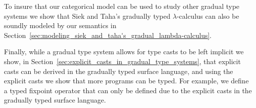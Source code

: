 To insure that our categorical model can be used to study other
gradual type systems we show that Siek and Taha's gradually typed
$\lambda$-calculus \cite{Siek:2006,Siek:2015} can also be soundly
modeled by our semantics in
Section~\ref{sec:modeling_siek_and_taha's_gradual_lambda-calculus}.

Finally, while a gradual type system allows for type casts to be left
implicit we show, in
Section~\ref{sec:explicit_casts_in_gradual_type_systems}, that
explicit casts can be derived in the gradually typed surface language,
and using the explicit casts we show that more programs can be typed.
For example, we define a typed fixpoint operator that can only be
defined due to the explicit casts in the gradually typed surface
language.

